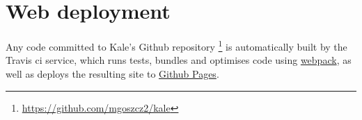 %




\section{Web deployment}
Any code committed to Kale's Github repository%
\footnote{\url{https://github.com/mgoszcz2/kale}}
is automatically built by the Travis \ac{ci} service, which runs tests, bundles
and optimises code using \href{https://webpack.js.org/}{webpack},
as well as deploys the resulting site to
\href{https://pages.github.com/}{Github Pages}.
